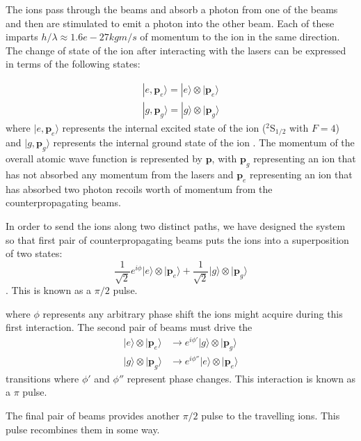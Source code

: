 The ions pass through the beams and absorb a photon from one of the beams and then are stimulated to emit a photon into the other beam. Each of these imparts $h/\lambda\approx 1.6e-27 kg m/s$ of momentum to the ion in the same direction. The change of state of the ion after interacting with the lasers can be expressed in terms of the following states: 

\begin{align}
|e,\mathbf{p}_e\rangle = |e\rangle \otimes |\mathbf{p}_e\rangle \\
|g,\mathbf{p}_g\rangle = |g\rangle \otimes |\mathbf{p}_g\rangle
\end{align} 
where $|e,\mathbf{p}_e\rangle$ represents the internal excited state of the ion ($^2$S$_{1/2}$ with $F=4$) and $|g,\mathbf{p}_g\rangle$ represents the internal ground state of the ion \cite{Young1997363}.
 The momentum of the overall atomic wave function is represented by $\mathbf{p}$, with $\mathbf{p}_g$ representing an ion that has not absorbed any momentum from the lasers and $\mathbf{p}_e$ representing an ion that has absorbed two photon recoils worth of momentum from the counterpropagating beams. 

In order to send the ions along two distinct paths, we have designed the system so that first pair of counterpropagating beams puts the ions into a superposition of two states:
\begin{equation}
\frac{1}{\sqrt{2}}e^{i\phi} |e\rangle \otimes |\mathbf{p}_e\rangle +
\frac{1}{\sqrt{2}} |g\rangle \otimes |\mathbf{p}_g\rangle
\end{equation}.
This is known as a $\pi/2$ pulse.

where $\phi$ represents any arbitrary phase shift the ions might acquire during this first interaction. The second pair of beams must drive the 
\begin{align}
|e\rangle \otimes |\mathbf{p}_e\rangle &\rightarrow e^{i\phi'} |g\rangle \otimes |\mathbf{p}_g\rangle \\
|g\rangle \otimes |\mathbf{p}_g\rangle & \rightarrow e^{i\phi''}|e\rangle \otimes |\mathbf{p}_e\rangle 
\end{align} 
transitions where $\phi'$ and $\phi''$ represent phase changes. This interaction is known as a $\pi$ pulse.

The final pair of beams provides another $\pi/2$ pulse to the travelling ions. This pulse recombines them in some way. 

